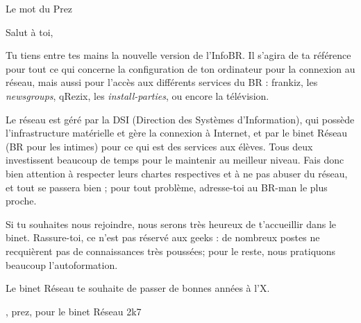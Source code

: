 
\begin{center}
    { \Huge Le mot du Prez }
\end{center}

\indent \indent Salut \`a toi,

Tu tiens entre tes mains la nouvelle version de l'InfoBR. Il s'agira de ta référence pour tout ce qui concerne la configuration de ton ordinateur pour la connexion au réseau, mais aussi pour l'accès aux différents services du BR :
frankiz, les \emph{newsgroups}, qRezix, les \emph{install-parties}, ou encore la télévision.

Le réseau est géré par la DSI (Direction des Systèmes d'Information), qui possède l'infrastructure matérielle et gère la connexion \`a Internet,
et par le binet Réseau (BR pour les intimes) pour ce qui est des services aux élèves. Tous deux investissent beaucoup de temps pour le maintenir au meilleur niveau.
Fais donc bien attention \`a respecter leurs chartes respectives et \`a ne pas abuser du réseau, et tout se passera bien ; pour tout problème, adresse-toi au
BR-man le plus proche.

Si tu souhaites nous rejoindre, nous serons très heureux de t'accueillir dans le binet. Rassure-toi, ce n'est pas réservé aux geeks : de nombreux postes ne recquièrent pas de connaissances très poussées; pour le reste, nous pratiquons beaucoup l'autoformation.

Le binet Réseau te souhaite de passer de bonnes années \`a l'X.\\



\begin{flushright}
    , prez, pour le binet Réseau 2k7 
\end{flushright}

